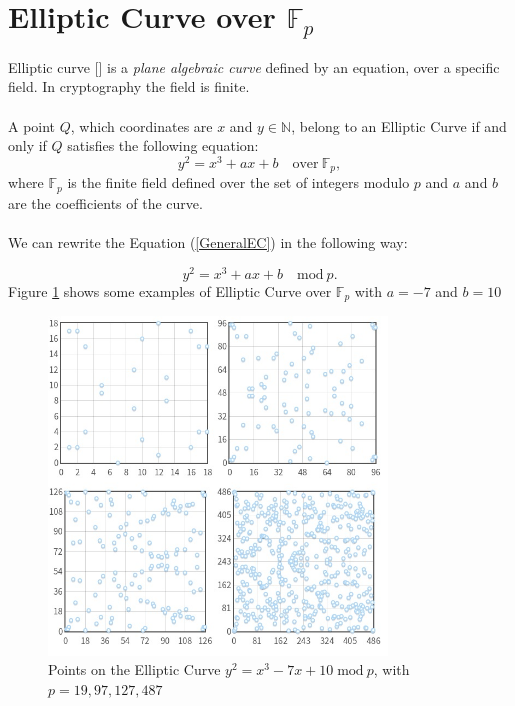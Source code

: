 \section{Elliptic Curve over $\mathbb{F}_p$}
Elliptic curve [\cite{7,8,9,10}] is a \textit{plane algebraic curve} defined by an equation, over a specific field. In cryptography the field is finite.
\\ \\
A point $Q$, which coordinates are $x$ and $y\in \mathbb{N}$, belong to an Elliptic Curve if and only if $Q$ satisfies the following equation:
\begin{equation}\label{GeneralEC}
y^2=x^3+ax+b \quad \textrm{over} \ \mathbb{F}_p,
\end{equation}
where $\mathbb{F}_p$ is the finite field defined over the set of integers modulo $p$ and $a$ and $b$ are the coefficients of the curve. \\ \\
We can rewrite the Equation (\ref{GeneralEC}) in the following way:

\begin{equation}\label{GeneralECmodp}
y^2=x^3+ax+b \quad \textrm{mod} \ p.
\end{equation}
Figure \ref{fig:EC_ex} shows some examples of Elliptic Curve over $\mathbb{F}_p$ with $a=-7$ and $b=10$
\begin{figure}[ht!]
	\centering
	\includegraphics[width=9cm]{Figures/EC_ex.jpg}
	\caption{Points on the Elliptic Curve $y^2=x^3-7x+10 \; \textrm{mod} \ p$, with $p=19,97,127,487$ }
	\label{fig:EC_ex}
\end{figure}

